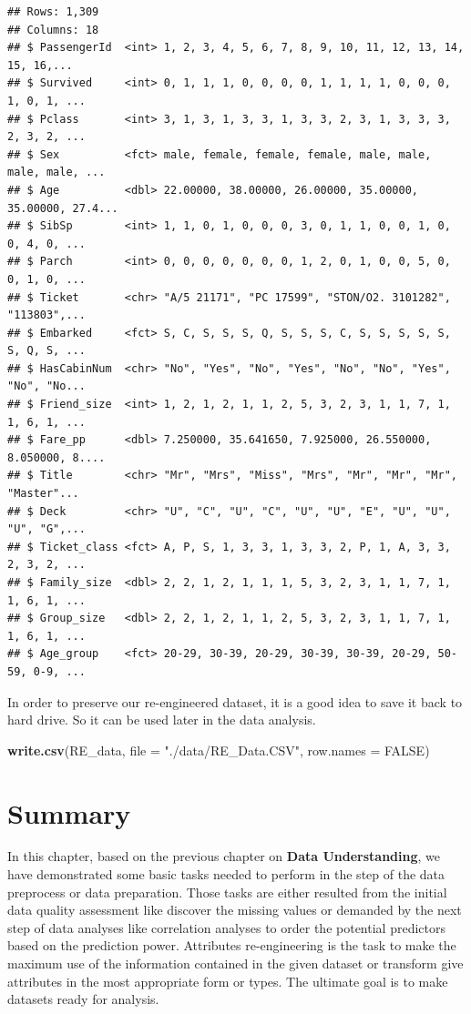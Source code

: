 \documentclass[
]{book}
\newenvironment{Shaded}{\begin{snugshade}}{\end{snugshade}}
\newcommand{\DataTypeTok}[1]{\textcolor[rgb]{0.13,0.29,0.53}{#1}}
\newcommand{\KeywordTok}[1]{\textcolor[rgb]{0.13,0.29,0.53}{\textbf{#1}}}
\newcommand{\NormalTok}[1]{#1}
\newcommand{\OtherTok}[1]{\textcolor[rgb]{0.56,0.35,0.01}{#1}}
\newcommand{\StringTok}[1]{\textcolor[rgb]{0.31,0.60,0.02}{#1}}
\begin{document}
\begin{verbatim}
## Rows: 1,309
## Columns: 18
## $ PassengerId  <int> 1, 2, 3, 4, 5, 6, 7, 8, 9, 10, 11, 12, 13, 14, 15, 16,...
## $ Survived     <int> 0, 1, 1, 1, 0, 0, 0, 0, 1, 1, 1, 1, 0, 0, 0, 1, 0, 1, ...
## $ Pclass       <int> 3, 1, 3, 1, 3, 3, 1, 3, 3, 2, 3, 1, 3, 3, 3, 2, 3, 2, ...
## $ Sex          <fct> male, female, female, female, male, male, male, male, ...
## $ Age          <dbl> 22.00000, 38.00000, 26.00000, 35.00000, 35.00000, 27.4...
## $ SibSp        <int> 1, 1, 0, 1, 0, 0, 0, 3, 0, 1, 1, 0, 0, 1, 0, 0, 4, 0, ...
## $ Parch        <int> 0, 0, 0, 0, 0, 0, 0, 1, 2, 0, 1, 0, 0, 5, 0, 0, 1, 0, ...
## $ Ticket       <chr> "A/5 21171", "PC 17599", "STON/O2. 3101282", "113803",...
## $ Embarked     <fct> S, C, S, S, S, Q, S, S, S, C, S, S, S, S, S, S, Q, S, ...
## $ HasCabinNum  <chr> "No", "Yes", "No", "Yes", "No", "No", "Yes", "No", "No...
## $ Friend_size  <int> 1, 2, 1, 2, 1, 1, 2, 5, 3, 2, 3, 1, 1, 7, 1, 1, 6, 1, ...
## $ Fare_pp      <dbl> 7.250000, 35.641650, 7.925000, 26.550000, 8.050000, 8....
## $ Title        <chr> "Mr", "Mrs", "Miss", "Mrs", "Mr", "Mr", "Mr", "Master"...
## $ Deck         <chr> "U", "C", "U", "C", "U", "U", "E", "U", "U", "U", "G",...
## $ Ticket_class <fct> A, P, S, 1, 3, 3, 1, 3, 3, 2, P, 1, A, 3, 3, 2, 3, 2, ...
## $ Family_size  <dbl> 2, 2, 1, 2, 1, 1, 1, 5, 3, 2, 3, 1, 1, 7, 1, 1, 6, 1, ...
## $ Group_size   <dbl> 2, 2, 1, 2, 1, 1, 2, 5, 3, 2, 3, 1, 1, 7, 1, 1, 6, 1, ...
## $ Age_group    <fct> 20-29, 30-39, 20-29, 30-39, 30-39, 20-29, 50-59, 0-9, ...
\end{verbatim}

In order to preserve our re-engineered dataset, it is a good idea to save it back to hard drive. So it can be used later in the data analysis.

\begin{Shaded}
\begin{Highlighting}[]
\KeywordTok{write.csv}\NormalTok{(RE_data, }\DataTypeTok{file =} \StringTok{"./data/RE_Data.CSV"}\NormalTok{, }\DataTypeTok{row.names =} \OtherTok{FALSE}\NormalTok{)}
\end{Highlighting}
\end{Shaded}

\hypertarget{summary-3}{%
\section*{Summary}\label{summary-3}}


In this chapter, based on the previous chapter on \textbf{Data Understanding}, we have demonstrated some basic tasks needed to perform in the step of the data preprocess or data preparation. Those tasks are either resulted from the initial data quality assessment like discover the missing values or demanded by the next step of data analyses like correlation analyses to order the potential predictors based on the prediction power. Attributes re-engineering is the task to make the maximum use of the information contained in the given dataset or transform give attributes in the most appropriate form or types. The ultimate goal is to make datasets ready for analysis.
\end{document}
